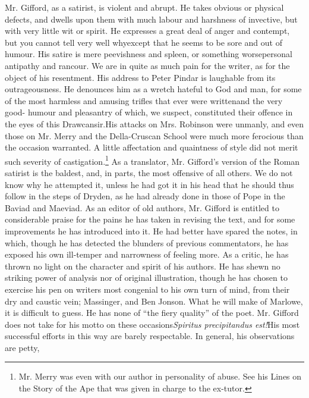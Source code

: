 \renewcommand*{\footnoterule}{}

Mr. Gifford, as a satirist, is violent and abrupt. He takes
obvious or physical defects, and dwells upon them with much labour
and harshness of invective, but with very little wit or spirit. He
expresses a great deal of anger and contempt, but you cannot tell
very well why\textemdash except that he seems to be sore and out
of humour. His satire is mere peevishness and spleen, or something
worse\textemdash personal antipathy and rancour. We are in quite
as much pain for the writer, as for the object of his resentment.
His address to Peter Pindar is laughable from its
outrageousness. He denounces him as a wretch hateful to God and
man, for some of the most harmless and amusing trifles that ever
were written\textemdash and the very good- humour and pleasantry
of which, we suspect, constituted their offence in the eyes of
this Drawcansir.\textemdash His attacks on Mrs. Robinson were
unmanly, and even those on Mr. Merry and the Della-Cruscan School
were much more ferocious than the occasion warranted. A little
affectation and quaintness of style did not merit such severity of
castigation.\footnote{Mr. Merry was even with our author in
  personality of abuse.  See his Lines on the Story of the Ape
  that was given in charge to the ex-tutor.} As a translator,
Mr. Gifford's version of the Roman satirist is the baldest, and,
in parts, the most offensive of all others. We do not know why he
attempted it, unless he had got it in his head that he should thus
follow in the steps of Dryden, as he had already done in those of
Pope in the Baviad and Maeviad. As an editor of old authors,
Mr. Gifford is entitled to considerable praise for the pains he
has taken in revising the text, and for some improvements he has
introduced into it. He had better have spared the notes, in which,
though he has detected the blunders of previous commentators, he
has exposed his own ill-temper and narrowness of feeling more. As
a critic, he has thrown no light on the character and spirit of
his authors. He has shewn no striking power of analysis nor of
original illustration, though he has chosen to exercise his pen on
writers most congenial to his own turn of mind, from their dry and
caustic vein; Massinger, and Ben Jonson. What he will make of
Marlowe, it is difficult to guess. He has none of ``the fiery
quality'' of the poet. Mr. Gifford does not take for his motto on
these occasions\textemdash \emph{Spiritus precipitandus
  est!}\textemdash His most successful efforts in this way are
barely respectable. In general, his observations are petty,
